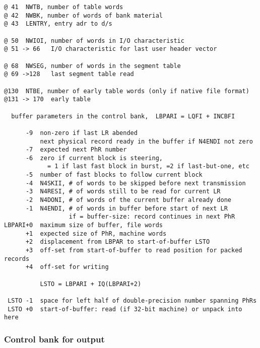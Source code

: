 \begin{verbatim}
@ 41  NWTB, number of table words
@ 42  NWBK, number of words of bank material
@ 43  LENTRY, entry adr to d/s

@ 50  NWIOI, number of words in I/O characteristic
@ 51 -> 66   I/O characteristic for last user header vector

@ 68  NWSEG, number of words in the segment table
@ 69 ->128   last segment table read

@130  NTBE, number of early table words (only if native file format)
@131 -> 170  early table

  buffer parameters in the control bank,  LBPARI = LQFI + INCBFI

      -9  non-zero if last LR abended
          next physical record ready in the buffer if N4ENDI not zero
      -7  expected next PhR number
      -6  zero if current block is steering,
            = 1 if last fast block in burst, =2 if last-but-one, etc
      -5  number of fast blocks to follow current block
      -4  N4SKII, # of words to be skipped before next transmission
      -3  N4RESI, # of words still to be read for current LR
      -2  N4DONI, # of words of the current buffer already done
      -1  N4ENDI, # of words in buffer before start of next LR
                  if = buffer-size: record continues in next PhR
LBPARI+0  maximum size of buffer, file words
      +1  expected size of PhR, machine words
      +2  displacement from LBPAR to start-of-buffer LSTO
      +3  off-set from start-of-buffer to read position for packed records
      +4  off-set for writing

          LSTO = LBPARI + IQ(LBPARI+2)

 LSTO -1  space for left half of double-precision number spanning PhRs
 LSTO +0  start-of-buffer: read (if 32-bit machine) or unpack into here
\end{verbatim}

\subsubsection*{Control bank for output}

